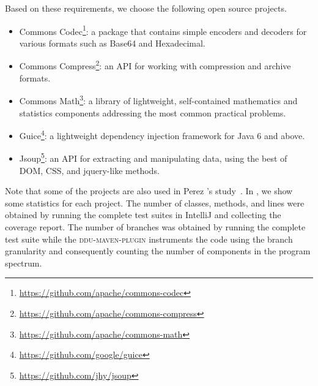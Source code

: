 \documentclass[twoside,a4paper,11pt]{memoir}
\begin{document}
Based on these requirements, we choose the following open source projects.
\begin{itemize}[noitemsep]
    \item Commons Codec\footnote{\url{https://github.com/apache/commons-codec}}: a package that contains simple encoders and decoders for various formats such as Base64 and Hexadecimal.
    \item Commons Compress\footnote{\url{https://github.com/apache/commons-compress}}: an API for working with compression and archive formats.
    \item Commons Math\footnote{\url{https://github.com/apache/commons-math}}: a library of lightweight, self-contained mathematics and statistics components addressing the most common practical problems.
    \item Guice\footnote{\url{https://github.com/google/guice}}: a lightweight dependency injection framework for Java 6 and above.
    \item Jsoup\footnote{\url{https://github.com/jhy/jsoup}}: an API for extracting and manipulating data, using the best of DOM, CSS, and jquery-like methods.
\end{itemize}
Note that some of the projects are also used in Perez \etal's study~\cite{DBLP:conf/icse/PerezAD17}.
In , we show some statistics for each project.
The number of classes, methods, and lines were obtained by running the complete test suites in IntelliJ and collecting the coverage report.
The number of branches was obtained by running the complete test suite while the \textsc{ddu-maven-plugin} instruments the code using the branch granularity and consequently counting the number of components in the program spectrum.
\end{document}
